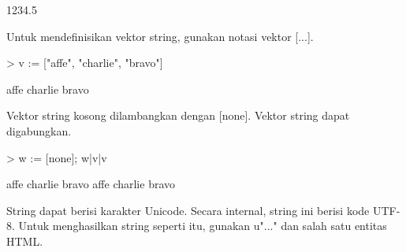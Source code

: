\documentclass[a4paper,10pt]{article}
\begin{document}
\begin{eulernotebook}
\begin{eulercomment}
\begin{eulercomment}
\begin{euleroutput}
  1234.5
\end{euleroutput}
\begin{eulercomment}
Untuk mendefinisikan vektor string, gunakan notasi vektor [...].
\end{eulercomment}
\begin{eulerprompt}
> v := ["affe", "charlie", "bravo"]
\end{eulerprompt}
\begin{euleroutput}
  affe
  charlie
  bravo
\end{euleroutput}
\begin{eulercomment}
Vektor string kosong dilambangkan dengan [none]. Vektor string dapat
digabungkan.
\end{eulercomment}
\begin{eulerprompt}
> w := [none]; w|v|v
\end{eulerprompt}
\begin{euleroutput}
  affe
  charlie
  bravo
  affe
  charlie
  bravo
\end{euleroutput}
\begin{eulercomment}
String dapat berisi karakter Unicode. Secara internal, string ini
berisi kode UTF-8. Untuk menghasilkan string seperti itu, gunakan
u"..." dan salah satu entitas HTML.


\end{eulercomment}
\end{eulercomment}
\end{eulercomment}
\end{eulernotebook}
\end{document}
